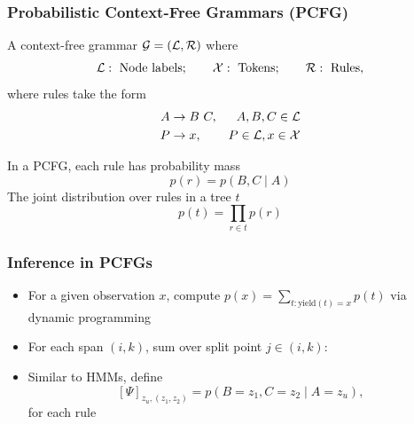 \documentclass{beamer}
\begin{document}
\begin{frame}
\frametitle{Probabilistic Context-Free Grammars (PCFG)}
A context-free grammar $\mathcal{G} = (\mathcal{L},\mathcal{R})$ where
$$
    \mathcal{L}: \text{ Node labels};\qquad
    \mathcal{X}: \text{ Tokens};\qquad
    \mathcal{R}: \text{ Rules},
$$
where rules take the form
\begin{align*}
A&\to B\ C, & A,B,C\in\mathcal{L} \\
P&\to x, & P \in\mathcal{L},x\in\mathcal{X}
\end{align*}

In a PCFG, each rule has probability mass
$$p(r) = p(B,C \mid A)$$
The joint distribution over rules in a tree $t$
$$p(t) = \prod_{r\in t} p(r)$$

\end{frame}

\begin{frame}
\frametitle{Inference in PCFGs}

\begin{itemize}
\item For a given observation $x$, compute $p(x) = \sum_{t: \text{yield}(t) = x} p(t)$
via dynamic programming
\vspace{1em}
\item For each span $(i,k)$, sum over split point $j \in (i,k)$:

\begin{center}
\end{center}

\item Similar to HMMs, define
$$[\Psi]_{z_u, (z_1,z_2)} = p(B=z_1,C=z_2 \mid A=z_u),$$
for each rule

\end{itemize}

\end{frame}
\end{document}
